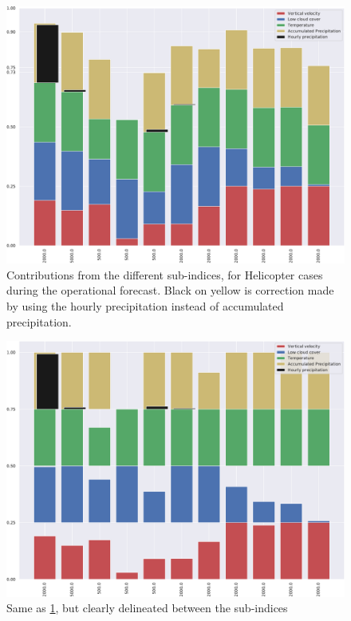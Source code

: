 \begin{figure}[H]
    \centering
    \includegraphics[width=\textwidth]{Figures/HeliAccum.pdf}
    \caption{Contributions from the different sub-indices, for Helicopter cases during the operational forecast. Black on yellow is correction made by using the hourly precipitation instead of accumulated precipitation.}
    \label{fig:HeliAccum}
\end{figure}

\begin{figure}[H]
    \centering
    \includegraphics[width=\textwidth]{Figures/HeliDecomp.pdf}
    \caption{Same as \ref{fig:HeliAccum}, but clearly delineated between the sub-indices}
    \label{fig:HeliDecomp}
\end{figure}

